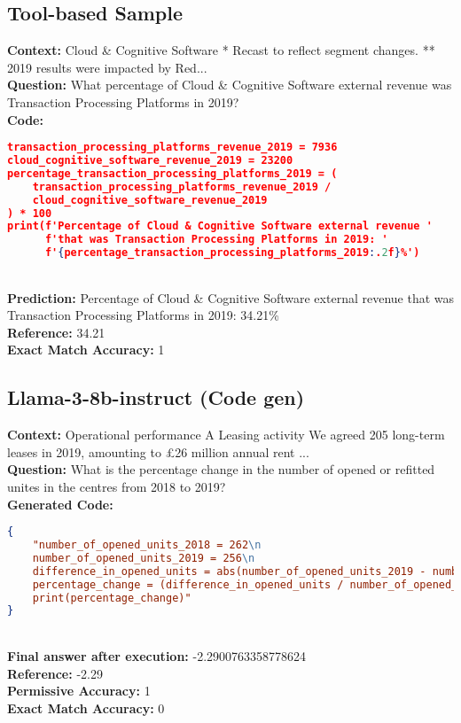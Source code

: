 \documentclass[logo,msc]{infthesis}           %
\begin{document}
\subsection{Tool-based Sample}
\textbf{Context:} Cloud \& Cognitive Software * Recast to reflect segment changes. ** 2019 results were impacted by Red...
\\
\textbf{Question:} What percentage of Cloud \& Cognitive Software external revenue was Transaction Processing Platforms in 2019?
\\
\textbf{Code:}
\begin{lstlisting}[language=json]
transaction_processing_platforms_revenue_2019 = 7936
cloud_cognitive_software_revenue_2019 = 23200
percentage_transaction_processing_platforms_2019 = (
    transaction_processing_platforms_revenue_2019 / 
    cloud_cognitive_software_revenue_2019
) * 100
print(f'Percentage of Cloud & Cognitive Software external revenue '
      f'that was Transaction Processing Platforms in 2019: '
      f'{percentage_transaction_processing_platforms_2019:.2f}%')
\end{lstlisting}
\\
\textbf{Prediction:} Percentage of Cloud \& Cognitive Software external revenue that was Transaction Processing Platforms in 2019: 34.21\%
\\
\textbf{Reference:} 34.21
\\
\textbf{Exact Match Accuracy:} 1

\subsection{Llama-3-8b-instruct (Code gen)}
\label{sample-output-code-gen}

\textbf{Context:} Operational performance A Leasing activity We agreed 205 long-term leases in 2019, amounting to £26 million annual rent ...
\\
\textbf{Question:} What is the percentage change in the number of opened or refitted unites in the centres from 2018 to 2019?
\\
\textbf{Generated Code:}
 \begin{lstlisting}[language=json]
{
    "number_of_opened_units_2018 = 262\n
    number_of_opened_units_2019 = 256\n
    difference_in_opened_units = abs(number_of_opened_units_2019 - number_of_opened_units_2018)\n
    percentage_change = (difference_in_opened_units / number_of_opened_units_2018) * 100\n
    print(percentage_change)"
}
\end{lstlisting}
\\
\textbf{Final answer after execution:} -2.2900763358778624
\\
\textbf{Reference:} -2.29
\\
\textbf{Permissive Accuracy:} 1
\\
\textbf{Exact Match Accuracy:} 0
\end{document}
